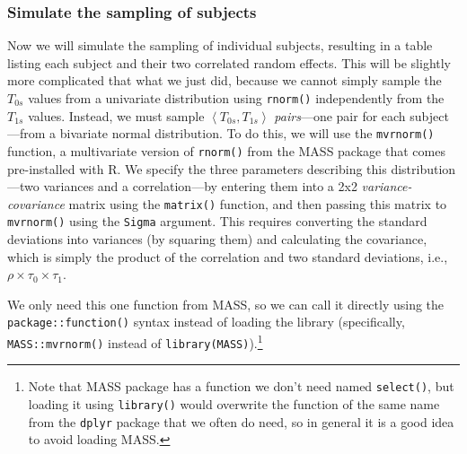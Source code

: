 \documentclass[english,doc,floatsintext]{apa6}
\begin{document}
\hypertarget{simulate-the-sampling-of-subjects}{%
\subsubsection{Simulate the sampling of subjects}\label{simulate-the-sampling-of-subjects}}

Now we will simulate the sampling of individual subjects, resulting in a table listing each subject and their two correlated random effects. This will be slightly more complicated that what we just did, because we cannot simply sample the \(T_{0s}\) values from a univariate distribution using \texttt{rnorm()} independently from the \(T_{1s}\) values. Instead, we must sample \(\left<T_{0s}, T_{1s}\right>\) \emph{pairs}---one pair for each subject---from a bivariate normal distribution. To do this, we will use the \texttt{mvrnorm()} function, a multivariate version of \texttt{rnorm()} from the MASS package that comes pre-installed with R. We specify the three parameters describing this distribution---two variances and a correlation---by entering them into a 2x2 \emph{variance-covariance} matrix using the \texttt{matrix()} function, and then passing this matrix to \texttt{mvrnorm()} using the \texttt{Sigma} argument. This requires converting the standard deviations into variances (by squaring them) and calculating the covariance, which is simply the product of the correlation and two standard deviations, i.e., \(\rho \times \tau_0 \times \tau_1\).

We only need this one function from MASS, so we can call it directly using the \texttt{package::function()} syntax instead of loading the library (specifically, \texttt{MASS::mvrnorm()} instead of \texttt{library(MASS)}).\footnote{Note that MASS package has a function we don't need named \texttt{select()}, but loading it using \texttt{library()} would overwrite the function of the same name from the \texttt{dplyr} package that we often do need, so in general it is a good idea to avoid loading MASS.}
\end{document}
